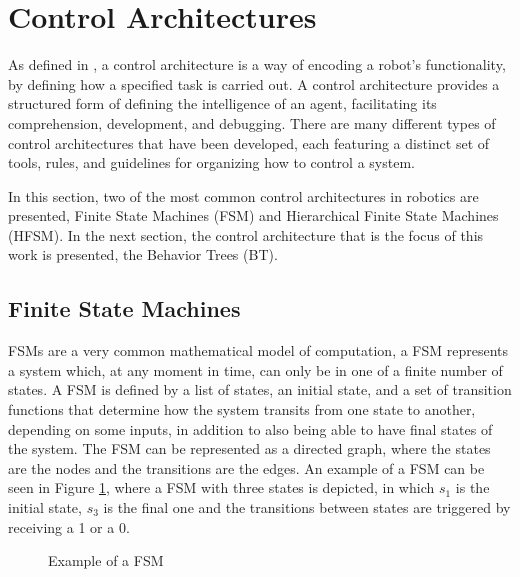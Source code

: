 \section{Control Architectures}

As defined in \cite{BTsInRobotics2}, a control architecture is a way of encoding a robot's functionality, by defining how a specified task is carried out. A control architecture provides a structured form of defining the intelligence of an agent, facilitating its comprehension, development, and debugging. There are many different types of control architectures that have been developed, each featuring a distinct set of tools, rules, and guidelines for organizing how to control a system.

In this section, two of the most common control architectures in robotics are presented, Finite State Machines (FSM) and Hierarchical Finite State Machines (HFSM). In the next section, the control architecture that is the focus of this work is presented, the Behavior Trees (BT).

\subsection{Finite State Machines}

FSMs are a very common mathematical model of computation, a FSM represents a system which, at any moment in time, can only be in one of a finite number of states. A FSM is defined by a list of states, an initial state, and a set of transition functions that determine how the system transits from one state to another, depending on some inputs, in addition to also being able to have final states of the system. The FSM can be represented as a directed graph, where the states are the nodes and the transitions are the edges. An example of a FSM can be seen in Figure \ref{fig:fsm_example}, where a FSM with three states is depicted, in which $s_1$ is the initial state, $s_3$ is the final one and the transitions between states are triggered by receiving a 1 or a 0.

\begin{figure}[!h]
    \centering
    \caption{Example of a FSM}
    \label{fig:fsm_example}
\end{figure}

